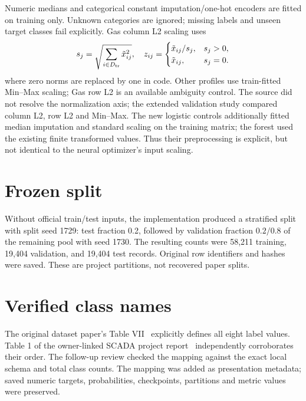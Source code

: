 \documentclass[11pt,a4paper]{report}
\begin{document}
Numeric medians and categorical constant imputation/one-hot encoders are fitted on training only. Unknown categories are ignored; missing labels and unseen target classes fail explicitly. Gas column L2 scaling uses
\begin{equation}s_j=\sqrt{\sum_{i\in D_{\rm tr}}\tilde{x}_{ij}^2},\quad z_{ij}=\begin{cases}\tilde{x}_{ij}/s_j,&s_j>0,\\\tilde{x}_{ij},&s_j=0.\end{cases}\end{equation}
where zero norms are replaced by one in code. Other profiles use train-fitted Min--Max scaling; Gas row L2 is an available ambiguity control. The source did not resolve the normalization axis; the extended validation study compared column L2, row L2 and Min--Max. The new logistic controls additionally fitted median imputation and standard scaling on the training matrix; the forest used the existing finite transformed values. Thus their preprocessing is explicit, but not identical to the neural optimizer's input scaling.

\section{Frozen split}
Without official train/test inputs, the implementation produced a stratified split with split seed 1729: test fraction 0.2, followed by validation fraction $0.2/0.8$ of the remaining pool with seed 1730. The resulting counts were 58,211 training, 19,404 validation, and 19,404 test records. Original row identifiers and hashes were saved. These are project partitions, not recovered paper splits.
\begin{table}[htbp]\centering
\caption{Measured class distribution in the frozen real Gas split, with class names verified from the original dataset paper. Code 0 denotes normal operation.}\end{table}

\section{Verified class names}
The original dataset paper's Table VII~\cite{morris2014} explicitly defines all eight label values. Table 1 of the owner-linked SCADA project report~\cite{hsu2014} independently corroborates their order. The follow-up review checked the mapping against the exact local schema and total class counts. The mapping was added as presentation metadata; saved numeric targets, probabilities, checkpoints, partitions and metric values were preserved.
\begin{table}[htbp]\centering\small
\caption{Verified Gas Pipeline class names and actual local counts. MFCI is also called malicious function code injection in the corroborating report.}\end{table}
\end{document}
